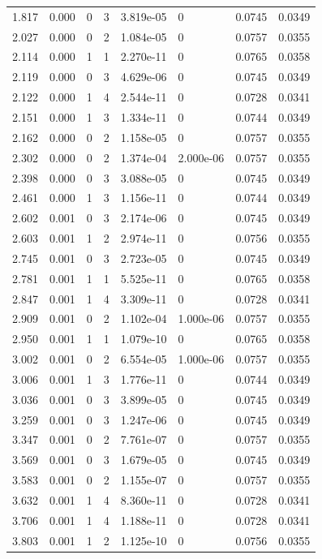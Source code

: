\documentclass[preview]{standalone}
\begin{document}
{{\begin{tabular}{L{1.2cm}C{1.2cm} C{0.3cm}C{0.5cm} C{1.4cm}C{1.4cm} C{1.4cm}C{1.4cm}}
  1.817  &  0.000  & 0     &  3 &  3.819e-05  & 0  & 0.0745 &  0.0349   \\ 
  2.027  &  0.000  & 0     &  2 &  1.084e-05  & 0  & 0.0757 &  0.0355   \\ 
  2.114  &  0.000  & 1     &  1 &  2.270e-11  & 0  & 0.0765 &  0.0358   \\ 
  2.119  &  0.000  & 0     &  3 &  4.629e-06  & 0  & 0.0745 &  0.0349   \\ 
  2.122  &  0.000  & 1     &  4 &  2.544e-11  & 0  & 0.0728 &  0.0341   \\ 
  2.151  &  0.000  & 1     &  3 &  1.334e-11  & 0  & 0.0744 &  0.0349   \\ 
  2.162  &  0.000  & 0     &  2 &  1.158e-05  & 0  & 0.0757 &  0.0355   \\ 
  2.302  &  0.000  & 0     &  2 &  1.374e-04  & 2.000e-06  & 0.0757 &  0.0355   \\ 
  2.398  &  0.000  & 0     &  3 &  3.088e-05  & 0  & 0.0745 &  0.0349   \\ 
  2.461  &  0.000  & 1     &  3 &  1.156e-11  & 0  & 0.0744 &  0.0349   \\ 
  2.602  &  0.001  & 0     &  3 &  2.174e-06  & 0  & 0.0745 &  0.0349   \\ 
  2.603  &  0.001  & 1     &  2 &  2.974e-11  & 0  & 0.0756 &  0.0355   \\ 
  2.745  &  0.001  & 0     &  3 &  2.723e-05  & 0  & 0.0745 &  0.0349   \\ 
  2.781  &  0.001  & 1     &  1 &  5.525e-11  & 0  & 0.0765 &  0.0358   \\ 
  2.847  &  0.001  & 1     &  4 &  3.309e-11  & 0  & 0.0728 &  0.0341   \\ 
  2.909  &  0.001  & 0     &  2 &  1.102e-04  & 1.000e-06  & 0.0757 &  0.0355   \\ 
  2.950  &  0.001  & 1     &  1 &  1.079e-10  & 0  & 0.0765 &  0.0358   \\ 
  3.002  &  0.001  & 0     &  2 &  6.554e-05  & 1.000e-06  & 0.0757 &  0.0355   \\ 
  3.006  &  0.001  & 1     &  3 &  1.776e-11  & 0  & 0.0744 &  0.0349   \\ 
  3.036  &  0.001  & 0     &  3 &  3.899e-05  & 0  & 0.0745 &  0.0349   \\ 
  3.259  &  0.001  & 0     &  3 &  1.247e-06  & 0  & 0.0745 &  0.0349   \\ 
  3.347  &  0.001  & 0     &  2 &  7.761e-07  & 0  & 0.0757 &  0.0355   \\ 
  3.569  &  0.001  & 0     &  3 &  1.679e-05  & 0  & 0.0745 &  0.0349   \\ 
  3.583  &  0.001  & 0     &  2 &  1.155e-07  & 0  & 0.0757 &  0.0355   \\ 
  3.632  &  0.001  & 1     &  4 &  8.360e-11  & 0  & 0.0728 &  0.0341   \\ 
  3.706  &  0.001  & 1     &  4 &  1.188e-11  & 0  & 0.0728 &  0.0341   \\ 
  3.803  &  0.001  & 1     &  2 &  1.125e-10  & 0  & 0.0756 &  0.0355   \\ 
\hline 
\end{tabular} 

}}
\end{document}
